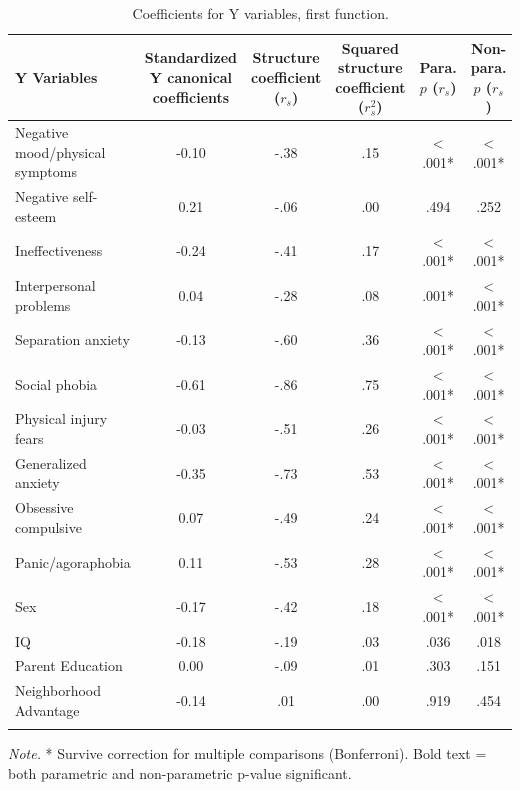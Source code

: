 \documentclass[
  english,
  man,floatsintext]{apa6}
\begin{document}
\begin{table}[tbp]

\begin{center}
\begin{threeparttable}

\caption{\label{tab:alt1_coeffytable}Coefficients for Y variables, first function.}

\small{

\begin{tabular}{lccccc}
\toprule
Y Variables & Standardized Y canonical coefficients & Structure coefficient ($r_{s}$) & Squared structure coefficient ($r^{2}_{s}$) & Para. $p$ ($r_{s}$) & Non-para. $p$ ($r_{s}$)\\
\midrule
Negative mood/physical symptoms & -0.10 & -.38 & .15 & < .001* & < .001*\\
Negative self-esteem & 0.21 & -.06 & .00 & .494 & .252\\
Ineffectiveness & -0.24 & -.41 & .17 & < .001* & < .001*\\
Interpersonal problems & 0.04 & -.28 & .08 & .001* & < .001*\\
Separation anxiety & -0.13 & -.60 & .36 & < .001* & < .001*\\
Social phobia & -0.61 & -.86 & .75 & < .001* & < .001*\\
Physical injury fears & -0.03 & -.51 & .26 & < .001* & < .001*\\
Generalized anxiety & -0.35 & -.73 & .53 & < .001* & < .001*\\
Obsessive compulsive & 0.07 & -.49 & .24 & < .001* & < .001*\\
Panic/agoraphobia & 0.11 & -.53 & .28 & < .001* & < .001*\\
Sex & -0.17 & -.42 & .18 & < .001* & < .001*\\
IQ & -0.18 & -.19 & .03 & .036 & .018\\
Parent Education & 0.00 & -.09 & .01 & .303 & .151\\
Neighborhood Advantage & -0.14 & .01 & .00 & .919 & .454\\
\bottomrule
\addlinespace
\end{tabular}

}

\begin{tablenotes}[para]
\normalsize{\textit{Note.} * Survive correction for multiple comparisons (Bonferroni). Bold text = both 
          parametric and non-parametric p-value significant.}
\end{tablenotes}

\end{threeparttable}
\end{center}

\end{table}
\end{document}
